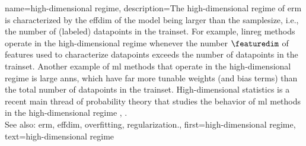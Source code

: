 {name={high-dimensional regime}, 
	description={The 
		high-dimensional regime of \gls{erm} is characterized by the \gls{effdim} of the \gls{model} 
		being larger than the \gls{samplesize}, i.e., the number of (labeled) \glspl{datapoint} in the \gls{trainset}. 
		For example, \gls{linreg} methods operate in the high-dimensional regime whenever the number $\featuredim$ of \glspl{feature} 
		used to characterize \glspl{datapoint} exceeds the number of \glspl{datapoint} in the \gls{trainset}. 
		Another example of \gls{ml} methods that operate in the high-dimensional regime is large \glspl{ann}, which have 
		far more tunable \glspl{weight} (and bias terms) than the total number of \glspl{datapoint} in the \gls{trainset}. 
		High-dimensional statistics is a recent main thread of \gls{probability} theory that studies the 
		behavior of \gls{ml} methods in the high-dimensional regime \cite{Wain2019}, \cite{BuhlGeerBook}.
				\\
		See also: \gls{erm}, \gls{effdim}, \gls{overfitting}, \gls{regularization}.},
   	first={high-dimensional regime},
	text={high-dimensional regime} 
}

